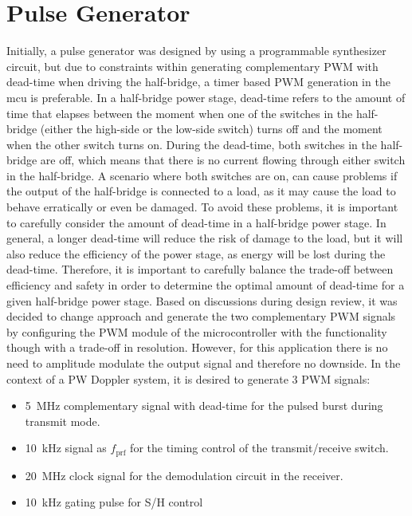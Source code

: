 
\section{Pulse Generator}
Initially, a pulse generator was designed by using a programmable synthesizer circuit, but due to constraints within generating complementary PWM with dead-time when driving the half-bridge, a timer based PWM generation in the \gls{mcu} is preferable. In a half-bridge power stage, dead-time refers to the amount of time that elapses between the moment when one of the switches in the half-bridge (either the high-side or the low-side switch) turns off and the moment when the other switch turns on. During the dead-time, both switches in the half-bridge are off, which means that there is no current flowing through either switch in the half-bridge. A scenario where both switches are on, can cause problems if the output of the half-bridge is connected to a load, as it may cause the load to behave erratically or even be damaged. To avoid these problems, it is important to carefully consider the amount of dead-time in a half-bridge power stage. In general, a longer dead-time will reduce the risk of damage to the load, but it will also reduce the efficiency of the power stage, as energy will be lost during the dead-time. Therefore, it is important to carefully balance the trade-off between efficiency and safety in order to determine the optimal amount of dead-time for a given half-bridge power stage. Based on discussions during design review, it was decided to change approach and generate the two complementary PWM signals by configuring the PWM module of the microcontroller with the functionality though with a trade-off in resolution. However, for this application there is no need to amplitude modulate the output signal and therefore no downside.
In the context of a PW Doppler system, it is desired to generate 3 PWM signals:
\begin{itemize}
	\item \qty{5}{\mega\hertz} complementary signal with dead-time for the pulsed burst during transmit mode.
	\item \qty{10}{\kilo\hertz} signal as $f_{\mathrm{prf}}$ for the timing control of the transmit/receive switch.
	\item \qty{20}{\mega\hertz} clock signal for the demodulation circuit in the receiver.
	\item \qty{10}{\kilo\hertz} gating pulse for S/H control
\end{itemize}


